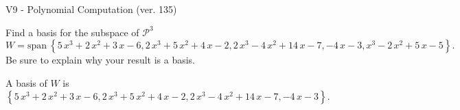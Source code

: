 \begin{exercise}
  \begin{exerciseTitle}V9 - Polynomial Computation (ver. 135)\end{exerciseTitle}
  \begin{exerciseStatement}
    Find a basis for the subspace of \(\mathcal{P}^3\) 
\[W=\mathrm{span}\ \left\{5 \, x^{3} + 2 \, x^{2} + 3 \, x - 6 , 2 \, x^{3} + 5 \, x^{2} + 4 \, x - 2 , 2 \, x^{3} - 4 \, x^{2} + 14 \, x - 7 , -4 \, x - 3 , x^{3} - 2 \, x^{2} + 5 \, x - 5\right\}.\]
 Be sure to explain why your result is a basis.


  \end{exerciseStatement}
  \begin{exerciseAnswer}
   A basis of \(W\) is  \(\left\{5 \, x^{3} + 2 \, x^{2} + 3 \, x - 6 , 2 \, x^{3} + 5 \, x^{2} + 4 \, x - 2 , 2 \, x^{3} - 4 \, x^{2} + 14 \, x - 7 , -4 \, x - 3\right\}\).
  


  \end{exerciseAnswer}
\end{exercise}